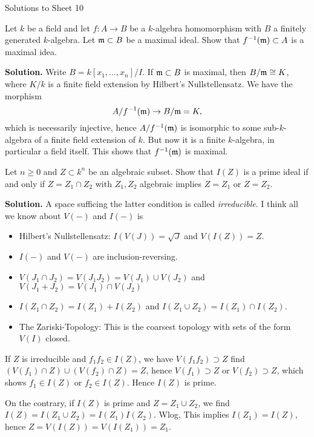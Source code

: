 \documentclass[a4paper,11pt]{article}
\begin{document}
\begin{center}
    \huge{Solutions to Sheet 10}
\end{center}

Let $k$ be a field and let $f: A\to B$ be a $k$-algebra homomorphism
with $B$ a finitely generated $k$-algebra. Let $\mathfrak{m} \subset B$ be 
a maximal ideal. Show that $f^{-1}(\mathfrak{m}) \subset A$ is a maximal idea.

\textbf{Solution.} Write $B = k[x_1, \dots, x_n]/I$. If $\mathfrak{m} \subset B$
is maximal, then $B/\mathfrak{m} \cong K$, where $K/k$ is a finite field extension 
by Hilbert's Nullstellensatz. We have the morphism
\begin{equation*}
    A/f^{-1}(\mathfrak{m}) \to B/\mathfrak{m} = K,
\end{equation*}
which is necessarily injective, hence $A/f^{-1}(\mathfrak{m})$ is isomorphic to some 
sub-$k$-algebra of a finite field extension of $k$. But now it is a finite
$k$-algebra, in particular a field itself. This shows that $f^{-1}(\mathfrak{m})$ 
is maximal.


Let $n \geq 0$ and $Z \subset k^n$ be an algebraic subset. Show that $I(Z)$
is a prime ideal if and only if $Z = Z_1 \cap Z_2$ with $Z_1, Z_2$ 
algebraic implies $Z = Z_1$ or $Z = Z_2$. 

\textbf{Solution.} A space sufficing the latter condition is called
\textit{irreducible}. I think all we know about $V(-)$ and 
$I(-)$ is
\begin{itemize}
    \item Hilbert's Nullstellensatz: $I(V(J)) = \sqrt J$ and $V(I(Z)) = Z$. 
    \item $I(-)$ and $V(-)$ are inclusion-reversing.
    \item $V(J_1 \cap J_2) = V(J_1 J_2) = V(J_1) \cup V(J_2)$ and $V(J_1 + J_2) = 
        V(J_1) \cap V(J_2)$
    \item $I(Z_1 \cap Z_2) = I(Z_1)+I(Z_2)$ and $I(Z_1 \cup Z_2) = I(Z_1)\cap
        I(Z_2)$. 
    \item The Zariski-Topology: This is the coarsest topology with sets of
        the form $V(I)$ closed. 
\end{itemize}

If $Z$ is irreducible and $f_1 f_2 \in I(Z)$,
we have $V(f_1 f_2) \supset Z$ find $( V(f_1) \cap Z ) \cup ( V(f_2) \cap Z ) =
Z$, hence $V(f_1) \supset Z$ or $V(f_2) \supset Z$, which shows 
$f_1 \in I(Z)$ or $f_2 \in I(Z)$. Hence $I(Z)$ is prime. 

On the contrary, if $I(Z)$ is prime and $Z = Z_1 \cup Z_2$, we find 
$I(Z) = I(Z_1 \cup Z_2) = I(Z_1) I(Z_2)$. Wlog, This implies $I(Z_1) = I(Z)$,
hence $Z = V(I(Z)) = V(I(Z_1)) = Z_1$.
\end{document}
